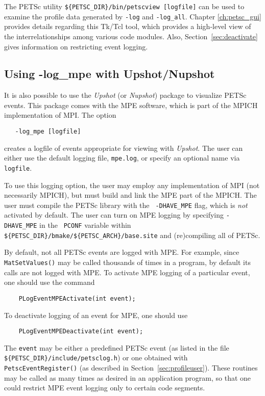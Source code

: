 {The PETSc utility {\tt \$\{PETSC\_DIR\}/bin/petscview [logfile]}
 can be used to examine the profile data generated by
{\tt -log} and {\tt -log\_all}.  Chapter \ref{ch:petsc_gui} provides
details regarding this Tk/Tcl tool, which provides a high-level view of
the interrelationships among various code modules. Also,
Section~\ref{sec:deactivate} gives information on restricting event logging.

\subsection{Using -log\_mpe with Upshot/Nupshot}
\label{sec:mpelogs}

It is also possible to use the {\em Upshot} (or {\em Nupshot}) package
\cite{upshot}    to visualize PETSc events. 
This package comes with the MPE software, which is part of the MPICH
\cite{mpich-web-page} implementation of MPI.
The option 
\begin{verbatim}
   -log_mpe [logfile]
\end{verbatim}
creates a logfile of events appropriate for viewing with {\em Upshot}.
The user can either use the default logging file, {\tt mpe.log}, or
specify an optional name via {\tt logfile}.  

To use this logging option, the user may employ any implementation of
MPI (not necessarily MPICH), but must build and link the MPE part of
the MPICH.  The user must compile the PETSc library with the {\tt
-DHAVE\_MPE} flag, which is {\em not} activated by default. The user
can turn on MPE logging by specifying {\tt -DHAVE\_MPE} in the {\tt
PCONF} variable within {\tt
\$\{PETSC\_DIR\}/bmake/\$\{PETSC\_ARCH\}/base.site} and (re)compiling all
of PETSc.

By default, not all PETSc events are logged with MPE. For example,
since {\tt MatSetValues()} may be called thousands of times in a program,
by default its calls are not logged with MPE. To activate MPE logging of
a particular event, one should use the command 
\begin{verbatim}
    PLogEventMPEActivate(int event);
\end{verbatim}
To deactivate logging of an event for MPE, one should use 
\begin{verbatim}
    PLogEventMPEDeactivate(int event);
\end{verbatim}
The {\tt event} may be either a predefined PETSc event (as listed in
the file {\tt \$\{PETSC\_DIR\}/include/petsclog.h}) or one obtained with
{\tt PetscEventRegister()} (as described in
Section~\ref{sec:profileuser}).  These routines may be called as many
times as desired in an application program, so that one could restrict
MPE event logging only to certain code segments.

}
